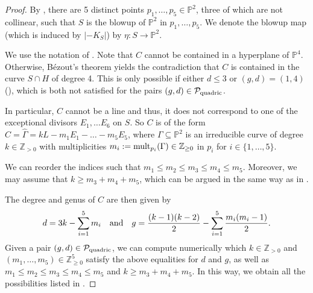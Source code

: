 \documentclass[english,11pt,reqno]{amsart}
\newcommand{\sub}{\subseteq}
\newcommand{\Ptwo}{\mathbb{P}^2}
\newcommand{\Pfour}{\mathbb{P}^4}
\newcommand{\Z}{\mathbb{Z}}
\begin{document}
%
%
\begin{proof}
By , there are 5 distinct points $p_1,\dots,p_5\in\Ptwo$, three of which are not collinear, such that $S$ is the blowup of $\Ptwo$ in $p_1,\dots,p_5$. We denote the blowup map (which is induced by $|-K_S|$) by $\eta:S\rightarrow \Ptwo$.  \par 
We use the notation of . Note that $C$ cannot be contained in a hyperplane of $\Pfour$. Otherwise, Bézout's theorem yields the contradiction that $C$ is contained in the curve $S\cap H$ of degree 4. This is only possible if either $d\leq 3$ or $(g,d)=(1,4)$ (), which is both not satisfied for the pairs $(g,d)\in\mathcal{P}_{\textup{quadric}}$. \par 
In particular, $C$ cannot be a line and thus, it does not correspond to one of the exceptional divisors $E_1,\dots E_6$ on $S$. So $C$ is of the form $C=\hat{\Gamma}=kL-m_1E_1-{\dots} -m_5E_5$, where $\Gamma \sub \Ptwo$ is an irreducible curve of degree $k\in \Z_{>0}$ with multiplicities $m_i:=\textup{mult}_{p_i}(\Gamma)\in \Z_{\geq 0}$ in $p_i$ for $i\in\{1,\dots,5\}$. \par
We can reorder the indices such that $m_1\leq m_2 \leq m_3 \leq m_4 \leq m_5$. Moreover, we may assume that $k\geq m_3 + m_4 + m_5$, which can be argued in the same way as in \cite[Set-Up 4.1]{Blanc_Lamy_Weak_Fano_threefolds}. \par 
The degree and genus of $C$ are then given by $$ d = 3k - \sum_{i=1}^5 m_i \quad \textup{and} \quad g= \frac{(k-1)(k-2)}{2} - \sum_{i=1}^5 \frac{m_i(m_i-1)}{2}.$$
Given a pair $(g,d)\in \mathcal{P}_{\textup{quadric}}$, we can compute numerically which $k\in \Z_{>0}$ and $(m_1,\dots,m_5)\in \Z_{\geq 0}^5$ satisfy the above equalities for $d$ and $g$, as well as $m_1\leq m_2 \leq m_3 \leq m_4 \leq m_5$ and $k\geq m_3 + m_4 + m_5$. In this way, we obtain all the possibilities listed in .
\end{proof}
%
\vspace{-0.5cm}
\end{document}
